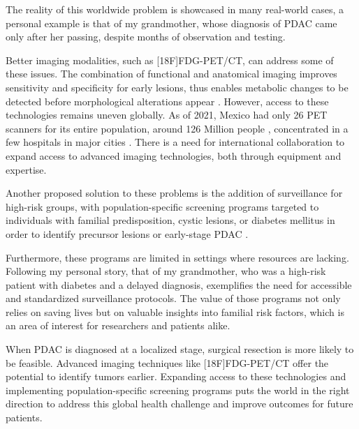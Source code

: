 The reality of this worldwide problem is showcased in many real-world cases, a personal example is that of my grandmother, whose diagnosis of PDAC came only after her passing, despite months of observation and testing.

Better imaging modalities, such as [18F]FDG-PET/CT, can address some of these issues. The combination of functional and anatomical imaging improves sensitivity and specificity for early lesions, thus enables metabolic changes to be detected before morphological alterations appear \cite{Pu2021}. However, access to these technologies remains uneven globally. As of 2021, Mexico had only 26 PET scanners for its entire population, around 126 Million people \cite{inegi_population}, concentrated in a few hospitals in major cities \cite{statista1}. There is a need for international collaboration to expand access to advanced imaging technologies, both through equipment and expertise.


Another proposed solution to these problems is the addition of surveillance for high-risk groups, with population-specific screening programs targeted to individuals with familial predisposition, cystic lesions, or diabetes mellitus in order to identify precursor lesions or early-stage PDAC \cite{Cancers2023}.

Furthermore, these programs are limited in settings where resources are lacking. Following my personal story, that of my grandmother, who was a high-risk patient with diabetes and a delayed diagnosis, exemplifies the need for accessible and standardized surveillance protocols. The value of those programs not only relies on saving lives but on valuable insights into familial risk factors, which is an area of interest for researchers and patients alike.

When PDAC is diagnosed at a localized stage, surgical resection is more likely to be feasible. Advanced imaging techniques like [18F]FDG-PET/CT offer the potential to identify tumors earlier. Expanding access to these technologies and implementing population-specific screening programs puts the world in the right direction to address this global health challenge and improve outcomes for future patients.
